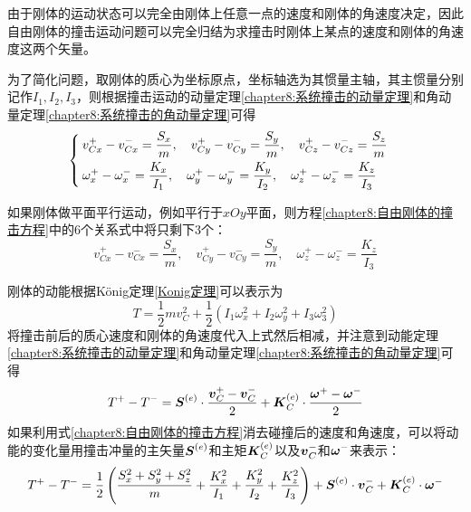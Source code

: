 由于刚体的运动状态可以完全由刚体上任意一点的速度和刚体的角速度决定，因此自由刚体的撞击运动问题可以完全归结为求撞击时刚体上某点的速度和刚体的角速度这两个矢量。

为了简化问题，取刚体的质心为坐标原点，坐标轴选为其惯量主轴，其主惯量分别记作$I_1, I_2, I_3$，则根据撞击运动的动量定理\eqref{chapter8:系统撞击的动量定理}和角动量定理\eqref{chapter8:系统撞击的角动量定理}可得
\begin{equation}
\begin{cases}
	\displaystyle v_{Cx}^+-v_{Cx}^- = \frac{S_x}{m},\quad v_{Cy}^+-v_{Cy}^- = \frac{S_y}{m},\quad v_{Cz}^+-v_{Cz}^- = \frac{S_z}{m} \\[1.5ex]
	\displaystyle \omega_x^+-\omega_x^- = \frac{K_x}{I_1},\quad \omega_y^+-\omega_y^- = \frac{K_y}{I_2},\quad \omega_z^+-\omega_z^- = \frac{K_z}{I_3}
\end{cases}
\label{chapter8:自由刚体的撞击方程}
\end{equation}

如果刚体做平面平行运动，例如平行于$xOy$平面，则方程\eqref{chapter8:自由刚体的撞击方程}中的6个关系式中将只剩下3个：
\begin{equation}
	v_{Cx}^+-v_{Cx}^- = \frac{S_x}{m},\quad v_{Cy}^+-v_{Cy}^- = \frac{S_y}{m},\quad \omega_z^+-\omega_z^- = \frac{K_z}{I_3}
	\label{chapter8:自由刚体的平面平行运动撞击方程}
\end{equation}

刚体的动能根据K\"onig定理\eqref{Konig定理}可以表示为
\begin{equation*}
	T = \frac12 mv_C^2 + \frac12 \left(I_1\omega_x^2+I_2\omega_y^2+I_3\omega_3^2\right)
\end{equation*}
将撞击前后的质心速度和刚体的角速度代入上式然后相减，并注意到动能定理\eqref{chapter8:系统撞击的动量定理}和角动量定理\eqref{chapter8:系统撞击的角动量定理}可得
\begin{equation}
	T^+-T^- = \boldsymbol{S}^{(e)}\cdot \frac{\boldsymbol{v}_C^+-\boldsymbol{v}_C^-}{2} + \boldsymbol{K}_C^{(e)}\cdot \frac{\boldsymbol{\omega}^+-\boldsymbol{\omega}^-}{2}
\end{equation}
如果利用式\eqref{chapter8:自由刚体的撞击方程}消去碰撞后的速度和角速度，可以将动能的变化量用撞击冲量的主矢量$\boldsymbol{S}^{(e)}$和主矩$\boldsymbol{K}_C^{(e)}$以及$\boldsymbol{v}_C^-$和$\boldsymbol{\omega}^-$来表示：
\begin{equation}
	T^+-T^- = \frac12\left(\frac{S_x^2+S_y^2+S_z^2}{m}+\frac{K_x^2}{I_1}+\frac{K_y^2}{I_2}+\frac{K_z^2}{I_3}\right) + \boldsymbol{S}^{(e)}\cdot\boldsymbol{v}_C^- + \boldsymbol{K}_C^{(e)}\cdot\boldsymbol{\omega}^-
	\label{chapter8:自由刚体撞击的动能变化}
\end{equation}

